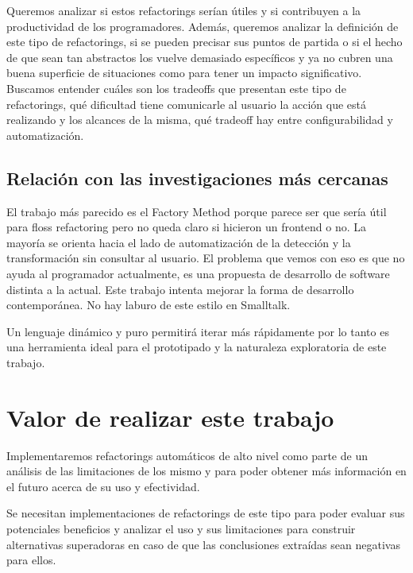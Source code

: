 Queremos analizar si estos refactorings serían útiles y si contribuyen a la productividad de los
programadores. Además, queremos analizar la definición de este tipo de refactorings, si se pueden
precisar sus puntos de partida o si el hecho de que sean tan abstractos los vuelve demasiado
específicos y ya no cubren una buena superficie de situaciones como para tener un impacto
significativo. Buscamos entender cuáles son los tradeoffs que presentan este tipo de refactorings,
qué dificultad tiene comunicarle al usuario la acción que está realizando y los alcances de la
misma, qué tradeoff hay entre configurabilidad y automatización.


\subsection{Relación con las investigaciones más cercanas}
El trabajo más parecido es el Factory Method porque parece ser que sería útil para floss refactoring
pero no queda claro si hicieron un frontend o no. La mayoría se orienta hacia el lado de
automatización de la detección y la transformación sin consultar al usuario. El problema que vemos
con eso es que no ayuda al programador actualmente, es una propuesta de desarrollo de software
distinta a la actual. Este trabajo intenta mejorar la forma de desarrollo contemporánea.
No hay laburo de este estilo en Smalltalk.

Un lenguaje dinámico y puro permitirá iterar más rápidamente por lo tanto es una herramienta ideal
para el prototipado y la naturaleza exploratoria de este trabajo.

\section{Valor de realizar este trabajo}
Implementaremos refactorings automáticos de alto nivel como parte de un análisis de las limitaciones
de los mismo y para poder obtener más información en el futuro acerca de su uso y efectividad.

Se necesitan implementaciones de refactorings de este tipo para poder evaluar sus
potenciales beneficios y analizar el uso y sus limitaciones para construir alternativas
superadoras en caso de que las conclusiones extraídas sean negativas para ellos.

